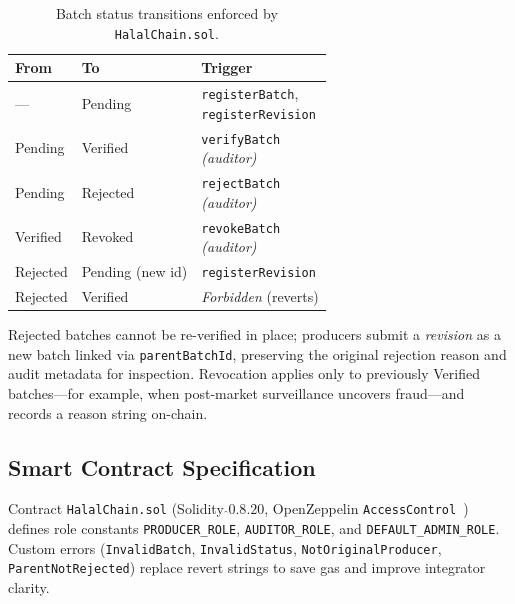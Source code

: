 \begin{table}[t]
  \caption{Batch status transitions enforced by \texttt{HalalChain.sol}.}
  \label{tab:fsm}
  \centering
  \footnotesize
  \setlength{\tabcolsep}{3pt}
  \begin{tabularx}{\columnwidth}{@{}>{\raggedright\arraybackslash}p{}>{\raggedright\arraybackslash}p{}>{\raggedright\arraybackslash}X@{}}
    \toprule
    \textbf{From} & \textbf{To} & \textbf{Trigger} \\
    \midrule
    --- & Pending & \makecell[tl]{\texttt{registerBatch},\\\texttt{registerRevision}} \\
    Pending & Verified & \makecell[tl]{\texttt{verifyBatch}\\\textit{(auditor)}} \\
    Pending & Rejected & \makecell[tl]{\texttt{rejectBatch}\\\textit{(auditor)}} \\
    Verified & Revoked & \makecell[tl]{\texttt{revokeBatch}\\\textit{(auditor)}} \\
    Rejected & Pending (new id) & \texttt{registerRevision} \\
    Rejected & Verified & \emph{Forbidden} (reverts) \\
    \bottomrule
  \end{tabularx}
\end{table}

Rejected batches cannot be re-verified in place; producers submit a \emph{revision} as a new batch linked via \texttt{parentBatchId}, preserving the original rejection reason and audit metadata for inspection.
Revocation applies only to previously Verified batches---for example, when post-market surveillance uncovers fraud---and records a reason string on-chain.

\subsection{Smart Contract Specification}
Contract \texttt{HalalChain.sol} (Solidity ${\hat{}}0.8.20$, OpenZeppelin \texttt{AccessControl}~\cite{openzeppelin2024access}) defines role constants \texttt{PRODUCER\_ROLE}, \texttt{AUDITOR\_ROLE}, and \texttt{DEFAULT\_ADMIN\_ROLE}.
Custom errors (\texttt{InvalidBatch}, \texttt{InvalidStatus}, \texttt{NotOriginalProducer}, \texttt{ParentNotRejected}) replace revert strings to save gas and improve integrator clarity.

